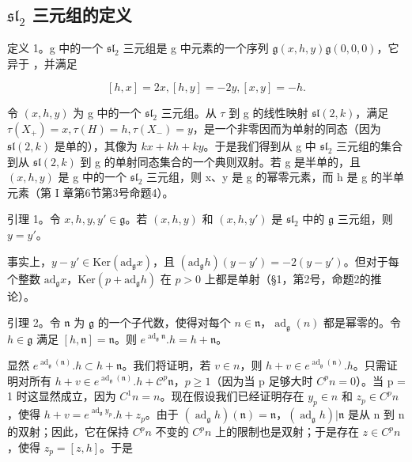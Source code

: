 \subsection{\texorpdfstring{\(\mathfrak{sl}_2\) 三元组的定义}{\textbackslash mathfrak\{sl\}\_2 三元组的定义}}

定义 1。g 中的一个 \(\mathfrak{sl}_2\) 三元组是 g 中元素的一个序列 \(\mathfrak{g}\)\((x, h, y)\)\(\mathfrak{g}\)\((0, 0, 0)\)，它异于 ，并满足

\[
[ h, x ] = 2 x, [ h, y ] = - 2 y, [ x, y ] = - h.
\]

令 \((x,h,y)\) 为 g 中的一个 \(\mathfrak{sl}_{2}\) 三元组。从 \(\tau\) 到 g 的线性映射 \(\mathfrak{sl}(2,k)\)，满足 \(\tau(X_{+}) = x, \tau(H) = h, \tau(X_{-}) = y\)，是一个非零因而为单射的同态（因为 \(\mathfrak{sl}(2,k)\) 是单的），其像为 \(kx + kh + ky\)。于是我们得到从 g 中 \(\mathfrak{sl}_{2}\) 三元组的集合到从 \(\mathfrak{sl}(2,k)\) 到 g 的单射同态集合的一个典则双射。若 g 是半单的，且 \((x,h,y)\) 是 g 中的一个 \(\mathfrak{sl}_{2}\) 三元组，则 x、y 是 g 的幂零元素，而 h 是 g 的半单元素（第 I 章第6节第3号命题4）。

引理 1。令 \(x, h, y, y' \in \mathfrak{g}\)。若 \((x, h, y)\) 和 \((x, h, y')\) 是 \(\mathfrak{sl}_2\) 中的 \(\mathfrak{g}\) 三元组，则 \(y = y'\)。

事实上，\(y - y' \in \mathrm{Ker}(\mathrm{ad}_{\mathfrak{g}}x)\)，且 \((\mathrm{ad}_{\mathfrak{g}}h)(y - y') = -2(y - y')\)。但对于每个整数 \(\mathrm{ad}_{\mathfrak{g}}x\)，\(\mathrm{Ker}(p + \mathrm{ad}_{\mathfrak{g}}h)\) 在 \(p > 0\) 上都是单射（§1，第2号，命题2的推论）。

引理 2。令 \(\mathfrak{n}\) 为 \(\mathfrak{g}\) 的一个子代数，使得对每个 \(n\in \mathfrak{n}\)，\(\operatorname{ad}_{\mathfrak{g}}(n)\) 都是幂零的。令 \(h\in \mathfrak{g}\) 满足 \([h,\mathfrak{n}] = \mathfrak{n}\)。则 \(e^{\operatorname{ad}_{\mathfrak{g}}\mathfrak{n}}.h = h + \mathfrak{n}\)。

显然 \(e^{\operatorname{ad}_{\mathfrak{g}}(\mathfrak{n})}.h \subset h + \mathfrak{n}\)。我们将证明，若 \(v \in n\)，则 \(h + v \in e^{\operatorname{ad}_{\mathfrak{g}}(\mathfrak{n})}.h\)。只需证明对所有 \(h + v \in e^{\operatorname{ad}_{\mathfrak{g}}(\mathfrak{n})}.h + \mathscr {C} ^ {p} \mathfrak {n}\)，\(p \geq 1\)（因为当 p 足够大时 \(C^{p}n = 0\)）。当 p = 1 时这显然成立，因为 \(C^{1}n = n\)。现在假设我们已经证明存在 \(y_{p} \in n\) 和 \(z_{p} \in C^{p}n\)，使得 \(h + v = e^{\operatorname{ad}_{\mathfrak{g}}y_{p}}.h + z_{p}\)。由于 \((\operatorname{ad}_{\mathfrak{g}}h)(\mathfrak{n}) = \mathfrak{n}\)，\((\operatorname{ad}_{\mathfrak{g}}h)|\mathfrak{n}\) 是从 n 到 n 的双射；因此，它在保持 \(C^{p}n\) 不变的 \(C^{p}n\) 上的限制也是双射；于是存在 \(z \in C^{p}n\)，使得 \(z_{p} = [z, h]\)。于是

